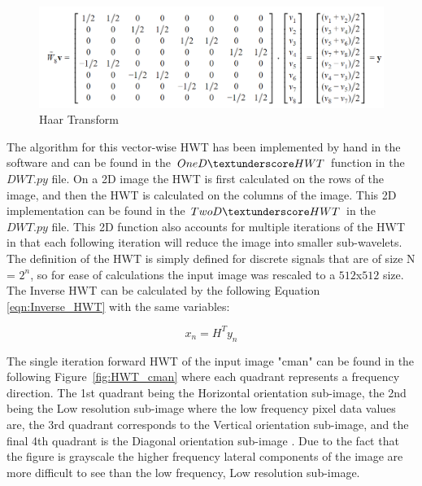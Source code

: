 \documentclass{article}\raggedbottom
\begin{document}
 \begin{figure}[h!]
 	\centering
	\includegraphics[width=\linewidth]{../../1_Resources/images/Haar_matrix_8.png}
	\caption{Haar Transform}
 	\label{fig:Haar_Forward}
 \end{figure}
 
 The algorithm for this vector-wise HWT has been implemented by hand in the software and can be found in the $OneD\textunderscore HWT$ function in the $DWT.py$ file. On a 2D image the HWT is first calculated on the rows of the image, and then the HWT is calculated on the columns of the image. This 2D implementation can be found in the $TwoD\textunderscore HWT$ in the $DWT.py$ file. This 2D function also accounts for multiple iterations of the HWT in that each following iteration will reduce the image into smaller sub-wavelets. The definition of the HWT is simply defined for discrete signals that are of size N = $2^n$, so for ease of calculations the input image was rescaled to a $512$x$512$ size. The Inverse HWT can be calculated by the following Equation \eqref{eqn:Inverse_HWT} with the same variables:
 
 \begin{equation}\label{eqn:Inverse_HWT}
 x_{n} = H^Ty_{n}
 \end{equation}
 
The single iteration forward HWT of the input image "cman" can be found in the following Figure~\ref{fig:HWT_cman} where each quadrant represents a frequency direction. The 1st quadrant being the Horizontal orientation sub-image, the 2nd being the Low resolution sub-image where the low frequency pixel data values are, the 3rd quadrant corresponds to the Vertical orientation sub-image, and the final 4th quadrant is the Diagonal orientation sub-image \cite{sengupta2012authentication}. Due to the fact that the figure is grayscale the higher frequency lateral components of the image are more difficult to see than the low frequency, Low resolution sub-image.
\end{document}
